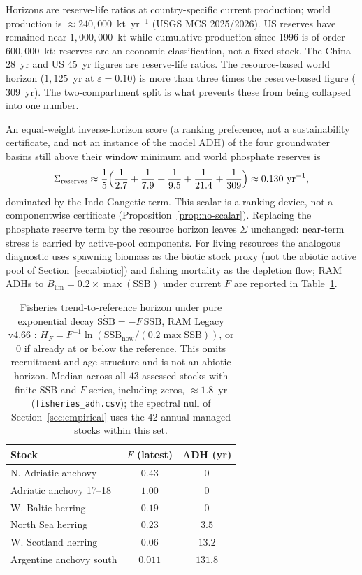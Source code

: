 \documentclass[11pt]{article}
\theoremstyle{definition}
\begin{document}
Horizons are reserve-life ratios at country-specific current production; world production is $\approx 240{,}000$~kt~yr$^{-1}$ (USGS MCS 2025/2026). US reserves have remained near $1{,}000{,}000$~kt while cumulative production since 1996 is of order $600{,}000$~kt: reserves are an economic classification, not a fixed stock. The China $28$~yr and US $45$~yr figures are reserve-life ratios. The resource-based world horizon ($1{,}125$~yr at $\varepsilon=0.10$) is more than three times the reserve-based figure ($309$~yr). The two-compartment split is what prevents these from being collapsed into one number.

An equal-weight inverse-horizon score (a ranking preference, not a sustainability certificate, and not an instance of the model ADH) of the four groundwater basins still above their window minimum and world phosphate reserves is
\[
\Sigma_{\mathrm{reserves}}\approx\frac15\Bigl(\frac1{2.7}+\frac1{7.9}+\frac1{9.5}+\frac1{21.4}+\frac1{309}\Bigr)\approx 0.130~\mathrm{yr}^{-1},
\]
dominated by the Indo-Gangetic term. This scalar is a ranking device, not a componentwise certificate (Proposition~\ref{prop:no-scalar}). Replacing the phosphate reserve term by the resource horizon leaves $\Sigma$ unchanged: near-term stress is carried by active-pool components. For living resources the analogous diagnostic uses spawning biomass as the biotic stock proxy (not the abiotic active pool of Section~\ref{sec:abiotic}) and fishing mortality as the depletion flow; RAM ADHs to $B_{\mathrm{lim}}=0.2\times\max(\mathrm{SSB})$ under current $F$ are reported in Table~\ref{tab:adh-fish}.

\begin{table}[t]
\centering\small
\caption{Fisheries trend-to-reference horizon under pure exponential decay $\dot{\mathrm{SSB}}=-F\,\mathrm{SSB}$, RAM Legacy v4.66 \cite{ricard2012,hansen2018}: $H_F=F^{-1}\ln(\mathrm{SSB}_{\mathrm{now}}/(0.2\max\mathrm{SSB}))$, or $0$ if already at or below the reference. This omits recruitment and age structure and is not an abiotic horizon. Median across all $43$ assessed stocks with finite SSB and $F$ series, including zeros, $\approx 1.8$~yr (\texttt{fisheries\_adh.csv}); the spectral null of Section~\ref{sec:empirical} uses the $42$ annual-managed stocks within this set.}
\label{tab:adh-fish}
\begin{tabular}{lcc}
\toprule
Stock & $F$ (latest) & ADH (yr) \\
\midrule
N. Adriatic anchovy & $0.43$ & $0$ \\
Adriatic anchovy 17--18 & $1.00$ & $0$ \\
W. Baltic herring & $0.19$ & $0$ \\
North Sea herring & $0.23$ & $3.5$ \\
W. Scotland herring & $0.06$ & $13.2$ \\
Argentine anchovy south & $0.011$ & $131.8$ \\
\bottomrule
\end{tabular}
\end{table}
\end{document}
